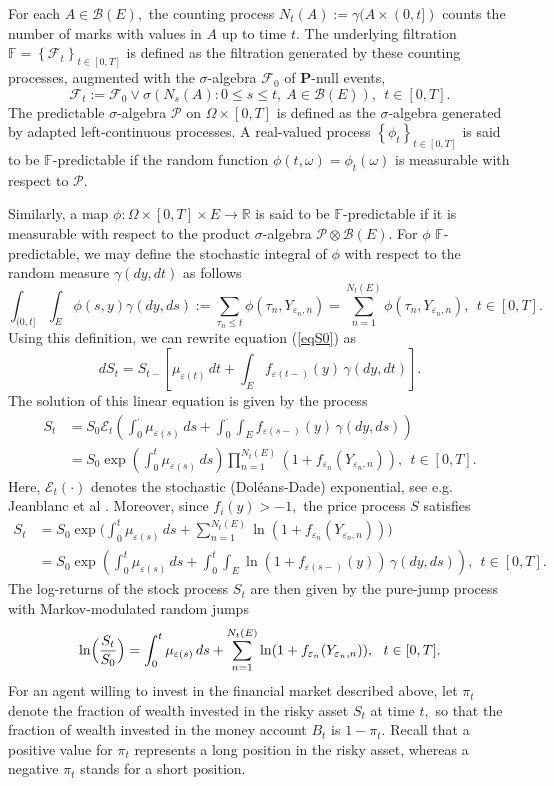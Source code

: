 \documentclass[11pt]{article}
\theoremstyle{plain}
\theoremstyle{definition}
\numberwithin{equation}{section}
\newcommand{\calF}{\mathcal{F}}
\newcommand{\calP}{\mathcal{P}}
\newcommand{\set}[1]{\left\{#1\right\}}
\newcommand{\eps}{\varepsilon}
\newcommand{\R}{\mathds{R}}
\newcommand{\Prob}{\mathbf{P}}
\newcommand{\B}{\mathcal{B}}
\newcommand{\Fil}{\mathds{F}}
\begin{document}
For each $A\in\B(E),$ the counting process $N_t(A):=\gamma(A\times(0,t])$ counts the number of marks with values in $A$ up to time $t.$ The underlying filtration $\Fil=\set{\calF_t}_{t\in  [0,T]}$ is defined as the filtration generated by these counting processes, augmented with the $\sigma$-algebra $\calF_0$ of $\Prob$-null events,
\[
\calF_t:=\calF_0\vee\sigma(N_s(A):0\le s\le t, \ A\in\B(E)), \ \ t\in  [0,T].
\]
The predictable $\sigma$-algebra $\calP$ on $\Omega\times  [0,T]$ is defined as the $\sigma$-algebra generated by adapted left-continuous processes. A real-valued process $\set{\phi_t}_{t\in  [0,T]}$ is said to be $\mathds{F}$-predictable if the random function $\phi(t,\omega)=\phi_t(\omega)$ is measurable with respect to $\calP$.

Similarly, a map $\phi:\Omega\times  [0,T]\times E\to\R$ is said to be $\Fil$-predictable if it is measurable with respect to the product $\sigma$-algebra $\calP\otimes\B(E).$ For $\phi$ $\Fil$-predictable, we may define the stochastic integral of $\phi$ with respect to the random measure $\gamma(dy,dt)$ as follows
\begin{equation*}
\int_{(0,t]}\int_{E} \phi(s,y)\gamma(dy,ds)
:=\sum_{\tau_n\leq t}\phi(\tau_n,Y_{\eps_n,n})=\sum_{n=1}^{N_t(E)}\phi(\tau_n,Y_{\eps_n,n}), \ \ t\in [0,T].
\end{equation*}
Using this definition, we can rewrite equation (\ref{eqS0})  as
\begin{equation}\label{eqS}
dS_t={S_{t-}}\left[\mu_{\eps(t)}\,dt+\int_{E} f_{\eps(t-)}(y)\,\gamma(dy,dt)\right].
\end{equation}
The solution of this linear equation is given by the process
\begin{align*}
S_t&=S_0\mathcal{E}_t\left(\int_0^\cdot\mu_{\eps(s)}\,ds+\int_0^\cdot\int_E f_{\eps(s-)}(y)\,\gamma(dy,ds) \right)\\
&=S_0\exp\left(\int_0^t\mu_{\eps(s)}\,ds\right)\prod_{n=1}^{N_t(E)}(1+f_{\eps_n}(Y_{\eps_n,n})), \ \ t\in [0,T].
  \end{align*}
Here, $\mathcal{E}_t(\cdot)$ denotes the stochastic (Dol\'{e}ans-Dade) exponential, see e.g. Jeanblanc et al \cite[Section 9.4.3]{jeanblanc}. Moreover, since $f_i(y)>-1,$ the price process $S$ satisfies
\begin{align*}
S_t&=S_0\exp\biggl(\int_0^t\mu_{\eps(s)}\,ds+\sum_{n=1}^{N_t(E)}\ln(1+f_{\eps_n}(Y_{\eps_n,n}))\biggr)\\
&=S_0\exp\left(\int_0^t\mu_{\eps(s)}\,ds+\int_0^t\int_{E}\ln(1+f_{\eps(s-)}(y))\,\gamma(dy,ds)\right), \ \ t\in [0,T].
\end{align*}
 The log-returns of the stock process $S_t$ are then given by the pure-jump process with Markov-modulated random jumps
\[
\ln\Bigl(\frac{S_t}{S_0}\Bigr)=\int_0^t\mu_{\eps(s)}\,ds+\sum_{n=1}^{N_t(E)}\ln(1+f_{\eps_n}(Y_{\eps_n,n})), \ \ t\in [0,T].
\]
For an agent willing to invest in the financial market described above, let $\pi_t$ denote the fraction of wealth invested in the risky asset $S_t$ at time $t,$ so that the fraction of wealth invested in the money account $B_t$ is $1-\pi_t.$ Recall that a positive value for $\pi_t$ represents a long position in the risky asset, whereas a negative $\pi_t$ stands for a short position.
\end{document}
